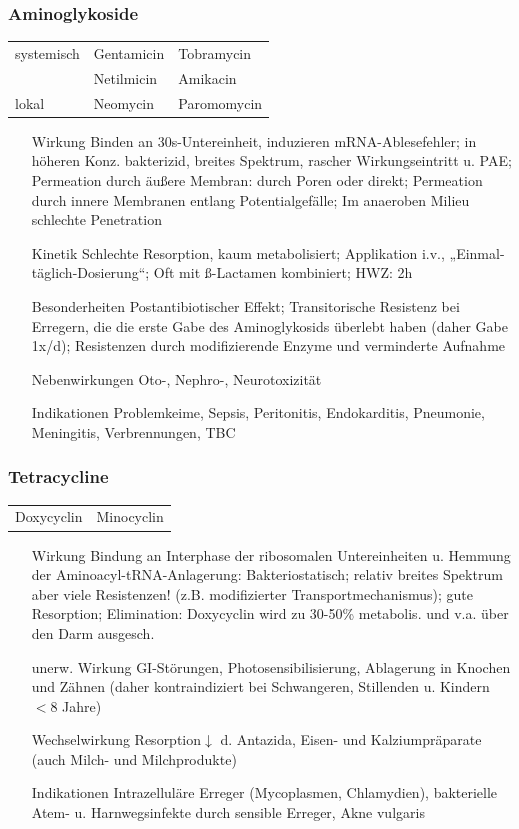 \documentclass[10pt,a4paper]{report}
\begin{document}
\subsubsection{Aminoglykoside} %
\label{ssub:aminoglykoside}
\begin{tabularx}{\textwidth}{XXX}
systemisch&Gentamicin&Tobramycin\\
&Netilmicin&Amikacin\\
lokal&Neomycin&Paromomycin\\
\end{tabularx}
\begin{itemize}
	\item[Wirkung]Binden an 30s-Untereinheit, induzieren mRNA-Ablesefehler; in höheren Konz. bakterizid, breites Spektrum, rascher Wirkungseintritt u. PAE; Permeation durch äußere Membran: durch Poren oder direkt; Permeation durch innere Membranen entlang Potentialgefälle; Im anaeroben Milieu schlechte Penetration 
	\item[Kinetik]Schlechte Resorption, kaum metabolisiert; Applikation i.v., „Einmal-täglich-Dosierung“; Oft mit ß-Lactamen kombiniert; HWZ: 2h 
	\item[Besonderheiten] Postantibiotischer Effekt; Transitorische Resistenz bei Erregern, die die erste Gabe des Aminoglykosids überlebt haben (daher Gabe 1x/d); Resistenzen durch modifizierende Enzyme und verminderte Aufnahme
	\item[Nebenwirkungen] Oto-, Nephro-, Neurotoxizität
	\item[Indikationen] Problemkeime, Sepsis, Peritonitis, Endokarditis, Pneumonie, Meningitis, Verbrennungen, TBC
\end{itemize}
\subsubsection{Tetracycline} %
\label{ssub:tetracycline}
\begin{tabularx}{\textwidth}{XX}
Doxycyclin&Minocyclin\\
\end{tabularx}
\begin{itemize}
	\item[Wirkung] Bindung an Interphase der ribosomalen Untereinheiten u. Hemmung der Aminoacyl-tRNA-Anlagerung: Bakteriostatisch; relativ breites Spektrum aber viele Resistenzen! (z.B. modifizierter Transportmechanismus); gute Resorption; Elimination: Doxycyclin wird zu 30-50\% metabolis. und v.a. über den Darm ausgesch.
	\item[unerw. Wirkung] GI-Störungen, Photosensibilisierung, Ablagerung in Knochen und Zähnen (daher kontraindiziert bei Schwangeren, Stillenden u. Kindern $<$8 Jahre)
	\item[Wechselwirkung] Resorption$\downarrow$ d. Antazida, Eisen- und Kalziumpräparate (auch Milch- und Milchprodukte)
	\item[Indikationen] Intrazelluläre Erreger (Mycoplasmen, Chlamydien), bakterielle Atem- u. Harnwegsinfekte durch sensible Erreger, Akne vulgaris
\end{itemize}
\end{document}
